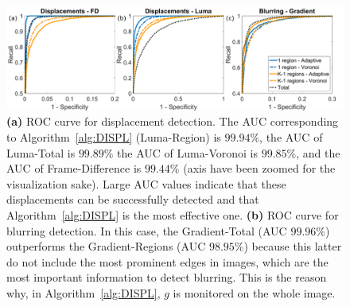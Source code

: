 \documentclass{llncs}
\begin{document}
\begin{figure}[t]
\centering
\includegraphics[width=1\linewidth]{Immagini/curve}
\caption{\textbf{(a)} ROC curve for displacement detection.
	The AUC corresponding to Algorithm~\ref{alg:DISPL} (Luma-Region) is $99.94\%$, the AUC of Luma-Total is $99.89\%$ the AUC of Luma-Voronoi is $99.85\%$, and the AUC of Frame-Difference is $99.44\%$ (axis have been zoomed for the visualization sake). Large AUC values indicate that these displacements can be successfully detected and that Algorithm~\ref{alg:DISPL} is the most effective one.
	\textbf{(b)} ROC curve for blurring detection.
	In this case, the Gradient-Total (AUC $99.96\%$) outperforms the Gradient-Regions (AUC $98.95\%$) because this latter do not include the most prominent edges in images, which are the most important information to detect blurring. This is the reason why, in Algorithm~\ref{alg:DISPL}, $g$ is monitored on the whole image.}
\label{fig:ROC}
\end{figure}
\end{document}
